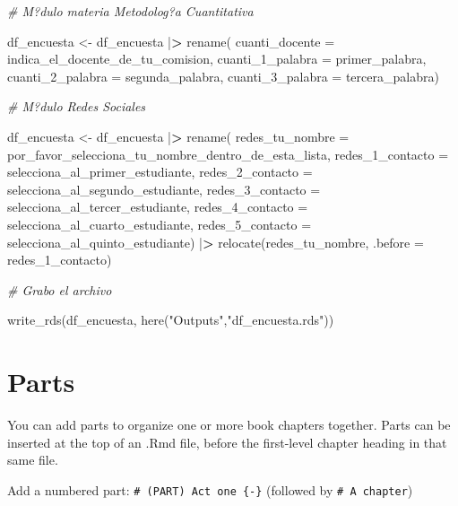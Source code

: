 \documentclass[
]{book}
\newenvironment{Shaded}{\begin{snugshade}}{\end{snugshade}}
\newcommand{\AttributeTok}[1]{\textcolor[rgb]{0.77,0.63,0.00}{#1}}
\newcommand{\CommentTok}[1]{\textcolor[rgb]{0.56,0.35,0.01}{\textit{#1}}}
\newcommand{\ErrorTok}[1]{\textcolor[rgb]{0.64,0.00,0.00}{\textbf{#1}}}
\newcommand{\FunctionTok}[1]{\textcolor[rgb]{0.00,0.00,0.00}{#1}}
\newcommand{\NormalTok}[1]{#1}
\newcommand{\OtherTok}[1]{\textcolor[rgb]{0.56,0.35,0.01}{#1}}
\newcommand{\SpecialCharTok}[1]{\textcolor[rgb]{0.00,0.00,0.00}{#1}}
\newcommand{\StringTok}[1]{\textcolor[rgb]{0.31,0.60,0.02}{#1}}
\theoremstyle{definition}
\theoremstyle{definition}
\theoremstyle{definition}
\theoremstyle{definition}
\theoremstyle{remark}
\begin{document}
\begin{Shaded}
\begin{Highlighting}[]
\CommentTok{\# M?dulo materia Metodolog?a Cuantitativa}

\NormalTok{df\_encuesta }\OtherTok{\textless{}{-}}\NormalTok{ df\_encuesta }\SpecialCharTok{|}\ErrorTok{\textgreater{}}
\FunctionTok{rename}\NormalTok{(}
\AttributeTok{cuanti\_docente =}\NormalTok{ indica\_el\_docente\_de\_tu\_comision,}
\AttributeTok{cuanti\_1\_palabra =}\NormalTok{ primer\_palabra,}
\AttributeTok{cuanti\_2\_palabra =}\NormalTok{ segunda\_palabra,}
\AttributeTok{cuanti\_3\_palabra =}\NormalTok{ tercera\_palabra)}

\CommentTok{\# M?dulo Redes Sociales}

\NormalTok{df\_encuesta }\OtherTok{\textless{}{-}}\NormalTok{ df\_encuesta }\SpecialCharTok{|}\ErrorTok{\textgreater{}}
\FunctionTok{rename}\NormalTok{(}
\AttributeTok{redes\_tu\_nombre =}\NormalTok{ por\_favor\_selecciona\_tu\_nombre\_dentro\_de\_esta\_lista,}
\AttributeTok{redes\_1\_contacto =}\NormalTok{ selecciona\_al\_primer\_estudiante,}
\AttributeTok{redes\_2\_contacto =}\NormalTok{ selecciona\_al\_segundo\_estudiante,}
\AttributeTok{redes\_3\_contacto =}\NormalTok{ selecciona\_al\_tercer\_estudiante,}
\AttributeTok{redes\_4\_contacto =}\NormalTok{ selecciona\_al\_cuarto\_estudiante,}
\AttributeTok{redes\_5\_contacto =}\NormalTok{ selecciona\_al\_quinto\_estudiante) }\SpecialCharTok{|}\ErrorTok{\textgreater{}}
\FunctionTok{relocate}\NormalTok{(redes\_tu\_nombre, }\AttributeTok{.before =}\NormalTok{ redes\_1\_contacto)}

\CommentTok{\# Grabo el archivo}

\FunctionTok{write\_rds}\NormalTok{(df\_encuesta,}
          \FunctionTok{here}\NormalTok{(}\StringTok{"Outputs"}\NormalTok{,}\StringTok{"df\_encuesta.rds"}\NormalTok{))}
                  
                  
\end{Highlighting}
\end{Shaded}

\hypertarget{parts}{%
\chapter{Parts}\label{parts}}

You can add parts to organize one or more book chapters together. Parts can be inserted at the top of an .Rmd file, before the first-level chapter heading in that same file.

Add a numbered part: \texttt{\#\ (PART)\ Act\ one\ \{-\}} (followed by \texttt{\#\ A\ chapter})
\end{document}
